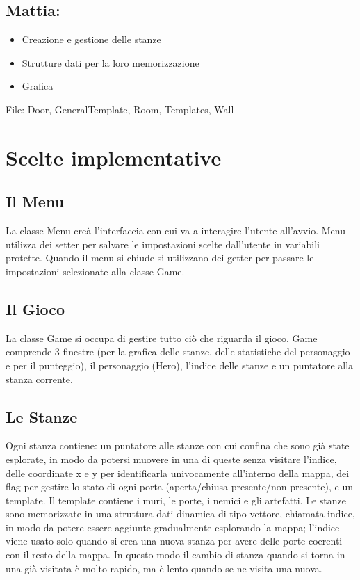 \documentclass[12pt]{article}
\begin{document}
\subsection*{Mattia:}
\begin{itemize}
    \item Creazione e gestione delle stanze 
    \item Strutture dati per la loro memorizzazione
    \item Grafica
\end{itemize}
File: Door, GeneralTemplate, Room, Templates, Wall

\newpage
\section{Scelte implementative}
\subsection{Il Menu}
La classe Menu creà l'interfaccia con cui va a interagire l'utente all'avvio. Menu utilizza dei setter per salvare le impostazioni
scelte dall'utente in variabili protette. Quando il menu si chiude si utilizzano dei getter per passare le impostazioni selezionate
alla classe Game.

\subsection{Il Gioco}
La classe Game si occupa di gestire tutto ciò che riguarda il gioco.
Game comprende 3 finestre (per la grafica delle stanze, delle statistiche del personaggio e per il punteggio), 
il personaggio (Hero), l'indice delle stanze e un puntatore alla stanza corrente.

\subsection{Le Stanze}
Ogni stanza contiene: un puntatore alle stanze con cui confina che sono già state esplorate, in modo da potersi muovere in una 
di queste senza visitare l'indice, delle coordinate x e y per identificarla univocamente all'interno della mappa, dei flag per
 gestire lo stato di ogni porta (aperta/chiusa presente/non presente), e un template. Il template contiene i muri, le porte, 
 i nemici e gli artefatti. \hfill\break
Le stanze sono memorizzate in una struttura dati dinamica di tipo vettore, chiamata indice, in modo da potere essere aggiunte gradualmente 
esplorando la mappa; l'indice viene usato solo quando si crea una nuova stanza per avere delle porte coerenti con il resto della mappa.
In questo modo il cambio di stanza quando si torna in una già visitata è molto rapido, ma è lento quando se ne visita una nuova. 
\end{document}
